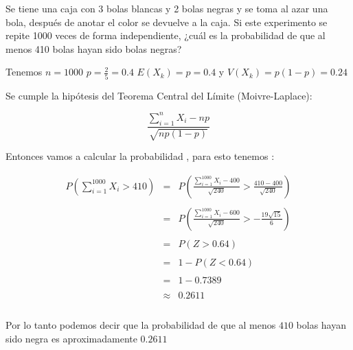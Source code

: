 \documentclass[10pt]{article}
\begin{document}
	\begin{flushleft}
		Se tiene una caja con 3 bolas blancas y 2 bolas negras y se toma al azar una bola, despu\'es de anotar el color se devuelve a la caja. Si este experimento se repite 1000 veces de forma independiente, ¿cu\'al es la probabilidad de que al menos 410 bolas hayan sido bolas negras?
	\end{flushleft}

	\begin{flushleft}
		Tenemos $n=1000$ $p=\frac{2}{5}=0.4$ $E(X_k) = p=0.4$ y $V (X_k) = p(1- p)=0.24$
	\end{flushleft}
	
	\begin{flushleft}
		Se cumple la hip\'otesis del Teorema Central del L\'imite (Moivre-Laplace):
	\end{flushleft}


	\begin{equation*}
		\frac{\sum_{i=1}^{n}X_i-np}{\sqrt{np(1-p)}}
	\end{equation*}


	\begin{flushleft}
		Entonces vamos a calcular la probabilidad , para esto tenemos : 
	\end{flushleft}
	
	\begin{equation*}
		\begin{array}{rcl}
			P(\sum_{i=1}^{1000}X_i > 410)  	& = &P(\frac{\sum_{i=1}^{1000}X_i-400}{\sqrt{240}}> \frac{410-400}{\sqrt{240}})
			\\
			\\
											& = & P(\frac{\sum_{i=1}^{1000}X_i-600}{\sqrt{240}}> -\frac{19\sqrt{15}}{6})
			\\
			\\
											& = &P(Z>0.64)
			\\
			\\
											& = & 1-P(Z<0.64)
			\\
			\\
	                                         & = & 1-0.7389
			\\
			\\
											 &\approx &  0.2611
			\\
			\\
		\end{array}
	\end{equation*}

	\begin{flushleft}
		Por lo tanto podemos decir que la probabilidad de que al menos $410$ bolas hayan sido negra es aproximadamente  $0.2611$
	\end{flushleft}
\end{document}
